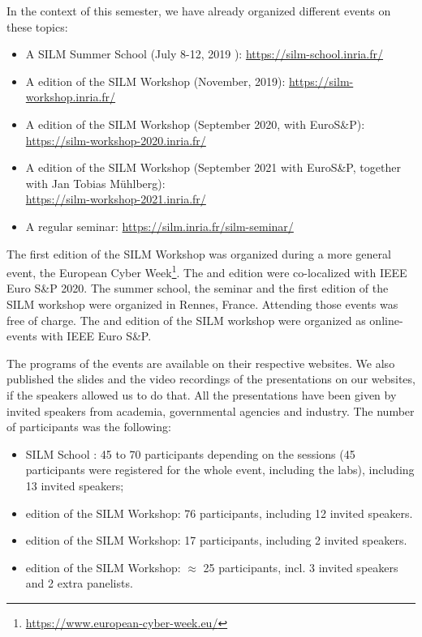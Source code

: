 \documentclass[a4paper,11pt]{article} %
\numberwithin{equation}{section} %
\numberwithin{figure}{section} %
\numberwithin{table}{section} %
\begin{document}
In the context of this semester, we have already organized different events
on these topics:
%
\begin{itemize}
%
    \item A SILM Summer School (July 8-12, 2019 ):
\url{https://silm-school.inria.fr/}
%
    \item A  edition of the SILM Workshop (November, 2019):
\url{https://silm-workshop.inria.fr/}
%
    \item A  edition of the SILM Workshop (September 2020, with
EuroS\&P): \\
\url{https://silm-workshop-2020.inria.fr/}
%
    \item A  edition of the SILM Workshop (September 2021 with
EuroS\&P, together
with Jan Tobias M\"uhlberg): \\
\url{https://silm-workshop-2021.inria.fr/}
%
    \item A regular seminar: \url{https://silm.inria.fr/silm-seminar/}
%
\end{itemize}

The first edition of the SILM Workshop was organized during a more general
event, the European Cyber Week\footnote{\url{https://www.european-cyber-week.eu/}}.
The  and  edition were co-localized with IEEE Euro S\&P 2020. 
% 
The summer school, the seminar and the first edition of the SILM workshop
were organized in Rennes, France. Attending those events was free of
charge. The  and  edition of the SILM workshop were organized as
online-events with IEEE Euro S\&P.

The programs of the events are available on their respective websites. We
also published the slides and the video recordings of the presentations on
our websites, if the speakers allowed us to do that. All the presentations
have been given by invited speakers from academia, governmental agencies
and industry. The number of participants was the following:
%
\begin{itemize}
%
    \item SILM School : 45 to 70 participants depending on the sessions (45
participants were registered for the whole event, including the labs),
including 13 invited speakers;
%
    \item {} edition of the SILM Workshop: 76 participants, including
12 invited speakers.
%
    \item {} edition of the SILM Workshop: 17 participants, including
2 invited speakers.
%
    \item {} edition of the SILM Workshop: $\approx$ 25 participants,
incl. 3 invited speakers and 2 extra panelists.
%
\end{itemize}
\end{document}
